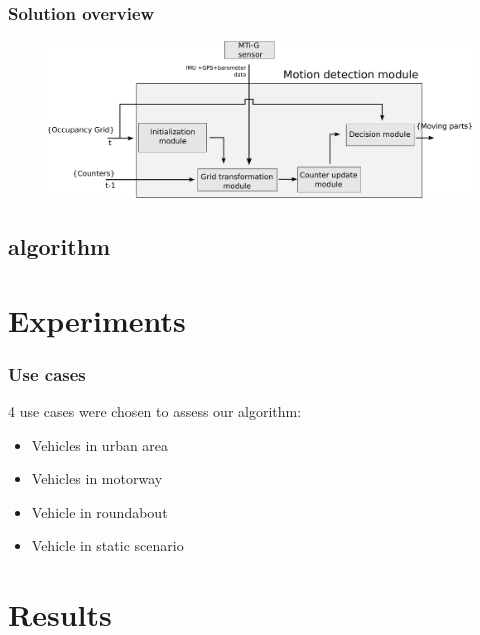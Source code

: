 \documentclass{beamer}
\begin{document}
	\begin{frame}
		\frametitle{Solution overview}
		\begin{figure}[h]
			\center
			\includegraphics[scale=0.30]{../img/fig:motion:framework:motionmodule}
		 \end{figure}
		
	\end{frame}		
	

\subsection{algorithm}


\section{Experiments}

	\begin{frame}
		\frametitle{Use cases}
		4 use cases were chosen to assess our algorithm:
		\begin{itemize}
		\item Vehicles in urban area
		\item Vehicles in motorway
		\item Vehicle in roundabout
		\item Vehicle in static scenario
		\end{itemize}						
	\end{frame}

\section{Results}
\end{document}
